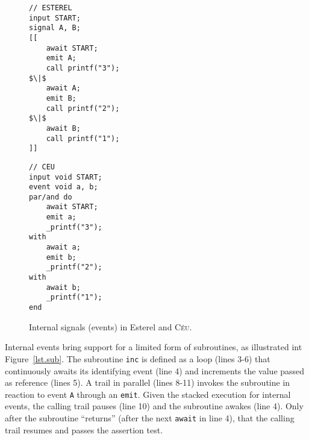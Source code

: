 \documentclass{acm_proc_article-sp}
\newcommand{\CEU}{\textsc{C\'{e}u}\xspace}
\newcommand{\code}[1] {{\small{\texttt{#1}}}}
\newcommand{\1}{\;}
\newcommand{\2}{\;\;}
\newcommand{\3}{\;\;\;}
\newcommand{\5}{\;\;\;\;\;}
\begin{document}
\begin{figure}[!t]
\begin{minipage}[t]{0.50\linewidth}
\begin{lstlisting}[mathescape=true]
// ESTEREL
input START;
signal A, B;
[[
    await START;
    emit A;
    call printf("3");
$\|$
    await A;
    emit B;
    call printf("2");
$\|$
    await B;
    call printf("1");
]]
\end{lstlisting}
\end{minipage}
%
\begin{minipage}[t]{0.45\linewidth}
\begin{lstlisting}
// CEU
input void START;
event void a, b;
par/and do
    await START;
    emit a;
    _printf("3");
with
    await a;
    emit b;
    _printf("2");
with
    await b;
    _printf("1");
end
\end{lstlisting}
\end{minipage}
\caption{ Internal signals (events) in Esterel and \CEU. \newline
\label{lst.prints}
}
\end{figure}

\begin{comment}
{\small
The order of execution for the \code{printf} calls in Esterel is unspecified.
For \CEU, they always print $1$, $2$, and $3$, in this exact order.
}
Signals in Esterel have immediate feedback, i.e., an \code{await} statement can 
react to an \code{emit} in the same time it is reached.
In \CEU, only previously awaiting trails can react to an event.

immediate feedback
    flip-flops
- synthesis of digital circuits
immediate feedback (digital components as simple as flip-flops

causality complications
Note that both internal and external events are unbuffered, i.e., at the moment 
an event occurs, only previously awaiting trails can react to that instance.
\end{comment}

Internal events bring support for a limited form of subroutines, as illustrated 
int Figure~\ref{lst.sub}.
The subroutine \code{inc} is defined as a loop (lines 3-6) that continuously 
awaits its identifying event (line 4) and increments the value passed as 
reference (lines 5).
A trail in parallel (lines 8-11) invokes the subroutine in reaction to event 
\code{A} through an \code{emit}.
Given the stacked execution for internal events, the calling trail pauses (line 
10) and the subroutine awakes (line 4).
Only after the subroutine ``returns'' (after the next \code{await} in line 4), 
that the calling trail resumes and passes the assertion test.
 
\end{document}
